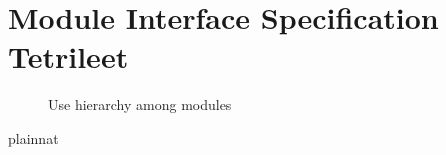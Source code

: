 \documentclass[12pt, titlepage]{article}
\begin{document}
\section{Module Interface Specification Tetrileet}



\begin{figure}[H]
\centering
\caption{Use hierarchy among modules}
\label{FigUH}
\end{figure}




 {plainnat}


\newpage{}
\end{document}
